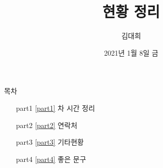 \documentclass[aspectratio=1610,20pt,xcolor=pdftex,dvipsnames,table,handout]{beamer}
\begin{document}
	

			\title{ 현황 정리 }
			\author{ 김대희 }
			\date{ 
					2021년 
					1월 
					8일
					금  
					} 


%
%
%
%
%



		\begin{frame}[plain]
		\titlepage
		\end{frame}


		\begin{frame} [plain]{목차}
		\tableofcontents%

			\setlength{\leftmargini}{ 2em}			
			\begin{itemize}

				\item [part1] \ref{part1}	차 시간 정리
				\item [part2] \ref{part2}	연락처
				\item [part3] \ref{part3}	기타현황
				\item [part4] \ref{part4}	좋은 문구

			\end{itemize}



		\end{frame}

		\begin{frame} [t,plain]
		\end{frame}						
		\begin{frame} [t,plain]
		\end{frame}						
\end{document}
